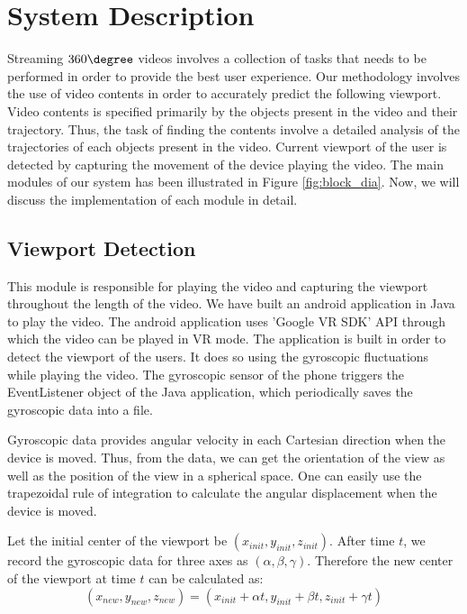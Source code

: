 \chapter{System Description}
Streaming $360\degree$ videos involves a collection of tasks that needs to be performed in order to provide the best user experience. Our methodology involves the use of video contents in order to accurately predict the following viewport. Video contents is specified primarily by the objects present in the video and their trajectory. Thus, the task of finding the contents involve a detailed analysis of the trajectories of each objects present in the video. Current viewport of the user is detected by capturing the movement of the device playing the video. The main modules of our system has been illustrated in Figure \ref{fig:block_dia}. Now, we will discuss the implementation of each module in detail.

\section{Viewport Detection}
This module is responsible for playing the video and capturing the viewport throughout the length of the video. We have built an android application in Java to play the video. The android application uses 'Google VR SDK' API through which the video can be played in VR mode. The application is built in order to detect the viewport of the users. It does so using the gyroscopic fluctuations while playing the video. The gyroscopic sensor of the phone triggers the EventListener object of the Java application, which periodically saves the gyroscopic data into a file.
\par
Gyroscopic data provides angular velocity in each Cartesian direction when the device is moved. Thus, from the data, we can get the orientation of the view as well as the position of the view in a spherical space. One can easily use the trapezoidal rule of integration to calculate the angular displacement when the device is moved.
\par
Let the initial center of the viewport be \((x_{init}, y_{init}, z_{init})\). After time \(t\), we record the gyroscopic data for three axes as \((\alpha, \beta, \gamma)\). Therefore the new center of the viewport at time \(t\) can be calculated as:
\[(x_{new}, y_{new}, z_{new}) = (x_{init}+\alpha t, y_{init}+\beta t, z_{init}+\gamma t)\]

